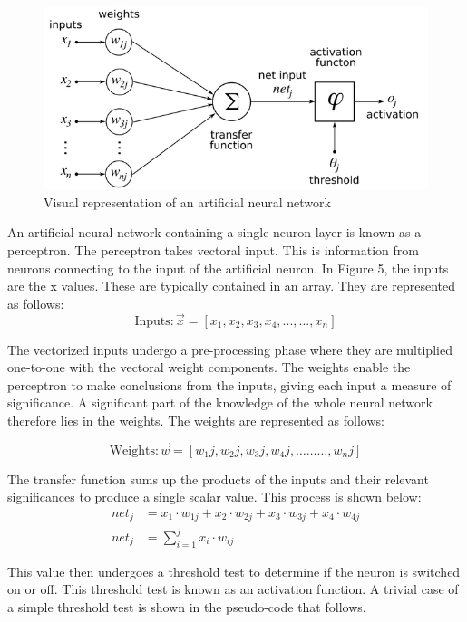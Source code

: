 \begin{figure}[h]
	\centering
	\includegraphics[scale=0.6]{5}
	\caption{Visual representation of an artificial neural network}
\end{figure}

An artificial neural network containing a single neuron layer is known as a perceptron. The perceptron takes vectoral input. This is information from neurons connecting to the input of the artificial neuron. In Figure 5, the inputs are the x values. These are typically contained in an array. They are represented as follows:
\begin{equation}
\text{Inputs}: \vec{x}= [x_1,x_2,x_3,x_4,..., ..., x_n]
\end{equation}

The vectorized inputs undergo a pre-processing phase where they are multiplied one-to-one with the vectoral weight components. The weights enable the perceptron to make conclusions from the inputs, giving each input a measure of significance. A significant part of the knowledge of the whole neural network therefore lies in the weights. The weights are represented as follows:
	
\begin{equation}
\text{Weights}: \vec{w} = [w_1j,w_2j,w_3j,w_4j,………,w_nj]
\end{equation}

The transfer function sums up the products of the inputs and their relevant significances to produce a single scalar value. This process is shown below:
\begin{align}
net_j &= x_1\cdot w_{1j}+ x_2\cdot w_{2j}+x_3\cdot w_{3j}+x_4\cdot w_{4j} \nonumber  \\
net_j &= \sum_{i=1}^j x_i \cdot w_{ij}
\end{align}

This value then undergoes a threshold test to determine if the neuron is switched on or off. This threshold test is known as an activation function. A trivial case of a simple threshold test is shown in the pseudo-code that follows.
		
